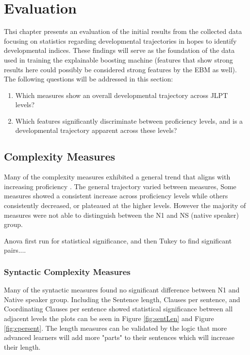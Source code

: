 \chapter{Evaluation} 
Thsi chapter presents an evaluation of the initial results from the collected data focusing on statistics regarding
developmental trajectories in hopes to identify developmental indices. These findings will serve as the foundation
of the data used in training the explainable boosting machine (features that show strong results here could possibly
be considered strong features by the EBM as well). The following questions will be addressed in this
section:

\begin{enumerate}
    \item Which measures show an overall developmental trajectory across JLPT levels?
    \item Which features significantly discriminate between proficiency levels, and is a developmental trajectory
    apparent across these levels?
\end{enumerate}

\section{Complexity Measures}

Many of the complexity measures exhibited a general trend that aligns with increasing proficiency . The general
trajectory varied between measures, Some measures
showed a consistent increase across proficiency levels while others consistently decreased, or plateaued at the
higher levels. However the majority of measures were not able to distinguish between the N1 and NS (native speaker)
group.

Anova first run for statistical significance, and then Tukey to find significant pairs....

\subsection{Syntactic Complexity Measures}



Many of the syntactic measures found no significant difference between N1 and Native speaker group. Including the
 Sentence length, Clauses per sentence, and Coordinating Clauses per sentence showed statistical significance
between all
adjacent levels the plots can be seen in Figure \ref{fig:sentLen} and Figure \ref{fig:cpersent}. The length measures
can be
validated by
the
logic
that
more advanced
learners will add
more "parts"
to their sentences which will increase their length.


